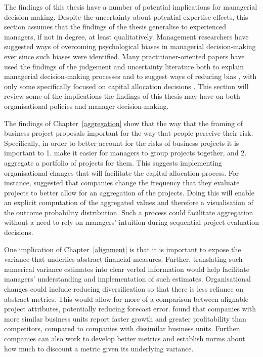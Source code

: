 \documentclass[a4paper, nobind, dvipsnames]{templates/ociamthesis}
\theoremstyle{definition}
\theoremstyle{definition}
\theoremstyle{definition}
\theoremstyle{definition}
\theoremstyle{remark}
\begin{document}
The findings of this thesis have a number of potential implications for
managerial decision-making. Despite the uncertainty about potential expertise
effects, this section assumes that the findings of the thesis generalise to
experienced managers, if not in degree, at least qualitatively. Management
researchers have suggested ways of overcoming psychological biases in managerial
decision-making ever since such biases were identified. Many
practitioner-oriented papers have used the findings of the judgement and
uncertainty literature both to explain managerial decision-making processes and
to suggest ways of reducing bias \autocite{lovallo2014,koller2012,hall2012,courtney1997,courtney2013,sibony2017}, with only some specifically focused
on capital allocation decisions \autocite{birshan2013}. This section will review some of
the implications the findings of this thesis may have on both organisational
policies and manager decision-making.

The findings of Chapter~\ref{aggregation} show that the way that the framing of
business project proposals important for the way that people perceive their
risk. Specifically, in order to better account for the risks of business
projects it is important to 1. make it easier for managers to group projects
together, and 2. aggregate a portfolio of projects for them. This suggests
implementing organisational changes that will facilitate the capital allocation
process. For instance, \textcite{lovallo2020} suggested that companies change the
frequency that they evaluate projects to better allow for an aggregation of the
projects. Doing this will enable an explicit computation of the aggregated
values and therefore a visualisation of the outcome probability distribution.
Such a process could facilitate aggregation without a need to rely on managers'
intuition during sequential project evaluation decisions.

One implication of Chapter~\ref{alignment} is that it is important to expose
the variance that underlies abstract financial measures. Further, translating
such numerical variance estimates into clear verbal information would help
facilitate managers' understanding and implementation of such estimates.
Organisational changes could include reducing diversification so that there is
less reliance on abstract metrics. This would allow for more of a comparison
between alignable project attributes, potentially reducing forecast error.
\textcite{koller2017} found that companies with more similar business units report faster
growth and greater profitability than competitors, compared to companies with
dissimilar business units. Further, companies can also work to develop better
metrics and establish norms about how much to discount a metric given its
underlying variance.
\end{document}
